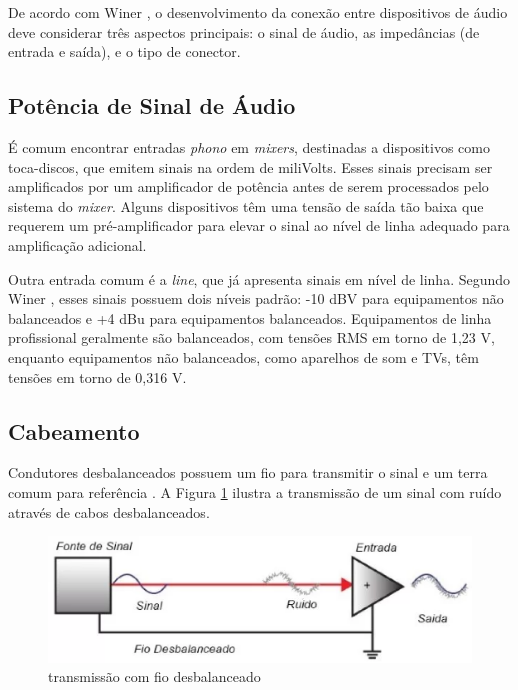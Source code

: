 De acordo com Winer \cite{winer}, o desenvolvimento da conexão entre dispositivos de áudio deve considerar três aspectos principais: o sinal de áudio, as impedâncias (de entrada e saída), e o tipo de conector.

\subsection{Potência de Sinal de Áudio}

É comum encontrar entradas \textit{phono} em \textit{mixers}, destinadas a dispositivos como toca-discos, que emitem sinais na ordem de miliVolts. Esses sinais precisam ser amplificados por um amplificador de potência antes de serem processados pelo sistema do \textit{mixer}. Alguns dispositivos têm uma tensão de saída tão baixa que requerem um pré-amplificador para elevar o sinal ao nível de linha adequado para amplificação adicional.

Outra entrada comum é a \textit{line}, que já apresenta sinais em nível de linha. Segundo Winer \cite{winer}, esses sinais possuem dois níveis padrão: -10 dBV para equipamentos não balanceados e +4 dBu para equipamentos balanceados. Equipamentos de linha profissional geralmente são balanceados, com tensões RMS em torno de 1,23 V, enquanto equipamentos não balanceados, como aparelhos de som e TVs, têm tensões em torno de 0,316 V.

\subsection{Cabeamento}

Condutores desbalanceados possuem um fio para transmitir o sinal e um terra comum para referência \cite{bartlett}. A Figura \ref{fig12} ilustra a transmissão de um sinal com ruído através de cabos desbalanceados.

\begin{figure}[h]
	\centering
    \includegraphics[scale=0.4]{figuras/fig11.eps}
	\caption{transmissão com fio desbalanceado \cite{proaudiospQualDiferena}}
	\label{fig12}
\end{figure}

